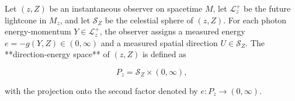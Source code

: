 Let $(z, Z)$ be an instantaneous observer on spacetime $M$, let $\mathcal{L}_z^+$ be the future lightcone in $M_z$, and let $\mathcal{S}_Z$ be the celestial sphere of $(z, Z)$. For each photon energy-momentum $Y \in \mathcal{L}_z^+$, the observer assigns a measured energy $e = -g(Y, Z) \in (0, \infty)$ and a measured spatial direction $U \in \mathcal{S}_Z$. The **direction-energy space** of $(z, Z)$ is defined as

$$P_z = \mathcal{S}_Z \times (0, \infty),$$

with the projection onto the second factor denoted by $e: P_z \to (0, \infty)$.
